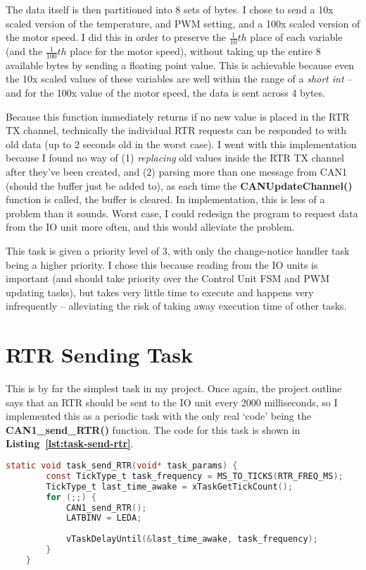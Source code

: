 \documentclass[a4paper, 12pt]{article}
\begin{document}
The data itself is then partitioned into 8 sets of bytes. I chose to send a 10x scaled version of the temperature, and PWM setting, and a 100x scaled version of the motor speed. I did this in order to preserve the $\frac{1}{10}th$ place of each variable (and the $\frac{1}{100}th$ place for the motor speed), without taking up the entire 8 available bytes by sending a floating point value. This is achievable because even the 10x scaled values of these variables are well within the range of a \emph{short int} -- and for the 100x value of the motor speed, the data is sent across 4 bytes.

Because this function immediately returns if no new value is placed in the RTR TX channel, technically the individual RTR requests can be responded to with old data (up to 2 seconds old in the worst case). I went with this implementation because I found no way of (1) \emph{replacing} old values inside the RTR TX channel after they've been created, and (2) parsing more than one message from CAN1 (should the buffer just be added to), as each time the \textbf{CANUpdateChannel()} function is called, the buffer is cleared. In implementation, this is less of a problem than it sounds. Worst case, I could redesign the program to request data from the IO unit more often, and this would alleviate the problem.

This task is given a priority level of 3, with only the change-notice handler task being a higher priority. I chose this because reading from the IO units is important (and should take priority over the Control Unit FSM and PWM updating tasks), but takes very little time to execute and happens very infrequently -- alleviating the risk of taking away execution time of other tasks.

\section{RTR Sending Task}
\label{sec:rtr-sending-task}

This is by far the simplest task in my project. Once again, the project outline says that an RTR should be sent to the IO unit every 2000 milliseconds, so I implemented this as a periodic task with the only real `code' being the \textbf{CAN1\_send\_RTR()} function. The code for this task is shown in \textbf{Listing~\ref{lst:task-send-rtr}}.

	\begin{mdframed}[backgroundcolor=code-gray, roundcorner=10pt,
								innerleftmargin=5, innertopmargin=5, innerbottommargin=5]	
	\begin{lstlisting}[language=C, caption=RTR Sending Task, tabsize=2, label={lst:task-send-rtr}]
	static void task_send_RTR(void* task_params) {
		const TickType_t task_frequency = MS_TO_TICKS(RTR_FREQ_MS);
		TickType_t last_time_awake = xTaskGetTickCount();
		for (;;) {
			CAN1_send_RTR();
			LATBINV = LEDA;
		
			vTaskDelayUntil(&last_time_awake, task_frequency);
		}
	}
	\end{lstlisting}
	\end{mdframed}
	
\end{document}
